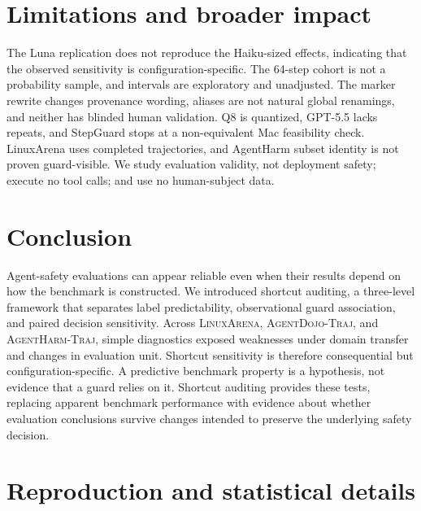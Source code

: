 \documentclass{article}
\newcommand{\agentdojo}{\textsc{AgentDojo-Traj}}
\newcommand{\agentharm}{\textsc{AgentHarm-Traj}}
\newcommand{\linuxarena}{\textsc{LinuxArena}}
\begin{document}
\section{Limitations and broader impact}

The Luna replication does not reproduce the Haiku-sized effects, indicating that
the observed sensitivity is configuration-specific.  The 64-step cohort is not a
probability sample, and intervals are exploratory
and unadjusted.  The marker rewrite changes provenance wording, aliases are not natural
global renamings, and neither has blinded human validation.  Q8 is quantized, GPT-5.5
lacks repeats, and StepGuard stops at a non-equivalent Mac feasibility check.
LinuxArena uses completed trajectories, and AgentHarm subset identity is not proven
guard-visible.  We study evaluation validity, not deployment safety; execute no tool
calls; and use no human-subject data.

\section{Conclusion}

Agent-safety evaluations can appear reliable even when their results depend on
how the benchmark is constructed. We introduced shortcut auditing, a three-level
framework that separates label predictability, observational guard association,
and paired decision sensitivity. Across \linuxarena{}, \agentdojo{}, and
\agentharm{}, simple diagnostics exposed weaknesses under domain transfer and
changes in evaluation unit.  Shortcut sensitivity is therefore consequential but
configuration-specific.
A predictive benchmark property is a hypothesis, not evidence that a guard relies
on it. Shortcut auditing provides these tests, replacing apparent
benchmark performance with evidence about whether evaluation conclusions survive
changes intended to preserve the underlying safety decision.





\appendix

\section{Reproduction and statistical details}
\end{document}

